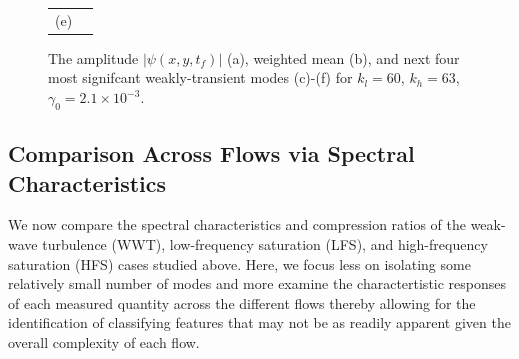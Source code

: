 \documentclass[aps,prl,preprint,groupedaddress]{revtex4-1}
\begin{document}
\begin{figure}[!ht]
\begin{tabular}{cc}
(e) & 
\end{tabular}
\caption{The amplitude $\left|\psi(x,y,t_{f})\right|$ (a), weighted mean (b), and next four most signifcant weakly-transient modes (c)-(f) for $k_{l}=60$, $k_{h}=63$, $\gamma_{0}=2.1\times 10^{-3}$. }
\label{fig:ampcomphf}
\end{figure}

\subsection*{Comparison Across Flows via Spectral Characteristics}
We now compare the spectral characteristics and compression ratios of the weak-wave turbulence (WWT), low-frequency saturation (LFS), and high-frequency saturation (HFS) cases studied above.  Here, we focus less on isolating some relatively small number of modes and more examine the charactertistic responses of each measured quantity across the different flows thereby allowing for the identification of classifying features that may not be as readily apparent given the overall complexity of each flow.  
\end{document}

